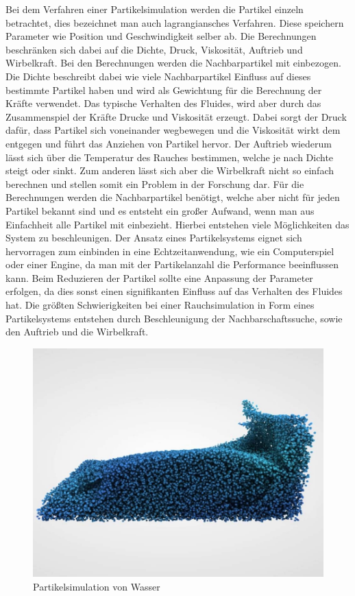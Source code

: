 \documentclass[intern,palatino]{cgBA}
\begin{document}
Bei dem Verfahren einer Partikelsimulation werden die Partikel einzeln betrachtet, dies bezeichnet man auch lagrangiansches Verfahren. Diese speichern Parameter wie Position und Geschwindigkeit selber ab. Die Berechnungen beschränken sich dabei auf die Dichte, Druck, Viskosität, Auftrieb und Wirbelkraft.
Bei den Berechnungen werden die Nachbarpartikel mit einbezogen. Die Dichte beschreibt dabei wie viele Nachbarpartikel Einfluss auf dieses bestimmte Partikel haben und wird als Gewichtung für die Berechnung der Kräfte verwendet. Das typische Verhalten des Fluides, wird aber durch das Zusammenspiel der Kräfte Drucke und Viskosität erzeugt. Dabei sorgt der Druck dafür, dass Partikel sich voneinander wegbewegen und die Viskosität wirkt dem entgegen und führt das Anziehen von Partikel hervor. Der Auftrieb wiederum lässt sich über die Temperatur des Rauches bestimmen, welche je nach Dichte steigt oder sinkt. Zum anderen lässt sich aber die Wirbelkraft nicht so einfach berechnen und stellen somit ein Problem in der Forschung dar.
Für die Berechnungen werden die Nachbarpartikel benötigt, welche aber nicht für jeden Partikel bekannt sind und es entsteht ein großer Aufwand, wenn man aus Einfachheit alle Partikel mit einbezieht. Hierbei entstehen viele Möglichkeiten das System zu beschleunigen.
\newline
Der Ansatz eines Partikelsystems eignet sich hervorragen zum einbinden in eine Echtzeitanwendung, wie ein Computerspiel oder einer Engine, da man mit der Partikelanzahl  die Performance beeinflussen kann. Beim Reduzieren der Partikel sollte eine Anpassung der Parameter erfolgen, da dies sonst einen signifikanten Einfluss auf das Verhalten des Fluides hat.
\newline
Die größten Schwierigkeiten bei einer Rauchsimulation in Form eines Partikelsystems entstehen durch Beschleunigung der Nachbarschaftssuche, sowie den Auftrieb und die Wirbelkraft.
\begin{figure}[h]
	\centering
	\includegraphics[width=0.7\columnwidth]{Bilder/partikelsystem.jpg}
	\caption[Partikelsimulation von Wasser \newline \url{https://i.ytimg.com/vi/DhNt_A3k4B4/maxresdefault.jpg}]{Partikelsimulation von Wasser}
	\label{img:Partikelsystem}
\end{figure}
\end{document}
